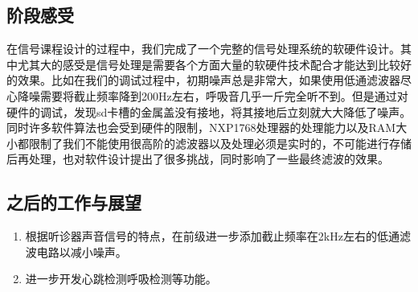 \documentclass[16pt,a4paper]{article}
\begin{document}
\subsection{阶段感受}
在信号课程设计的过程中，我们完成了一个完整的信号处理系统的软硬件设计。其中尤其大的感受是信号处理是需要各个方面大量的软硬件技术配合才能达到比较好的效果。比如在我们的调试过程中，初期噪声总是非常大，如果使用低通滤波器尽心降噪需要将截止频率降到200Hz左右，呼吸音几乎一斤完全听不到。但是通过对硬件的调试，发现sd卡槽的金属盖没有接地，将其接地后立刻就大大降低了噪声。同时许多软件算法也会受到硬件的限制，NXP1768处理器的处理能力以及RAM大小都限制了我们不能使用很高阶的滤波器以及处理必须是实时的，不可能进行存储后再处理，也对软件设计提出了很多挑战，同时影响了一些最终滤波的效果。
\subsection{之后的工作与展望}
\begin{enumerate}
\item 根据听诊器声音信号的特点，在前级进一步添加截止频率在2kHz左右的低通滤波电路以减小噪声。
\item 进一步开发心跳检测呼吸检测等功能。
\end{enumerate}
\end{document}
